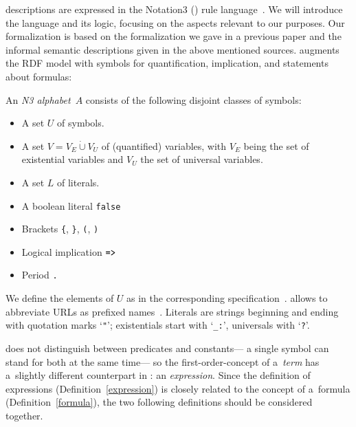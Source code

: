 
\restdesc descriptions are expressed in the Notation3 (\nthree) rule language~\cite{N3Logic,Notation3}.
We will introduce the \nthree language and its logic,
focusing on the aspects relevant to our purposes. Our formalization is based on the formalization we gave in a previous paper \cite{semN3} and the informal
semantic descriptions given in the above mentioned sources.
\nthree augments the RDF model with symbols for quantification, implication, and statements about formulas:


\begin{definition}
An \emph{N3 alphabet~$A$} consists of the following disjoint classes of symbols:
\begin{itemize}
\item A set $U$ of \uri symbols.
\item A set $V=V_E\mathbin{\dot{\cup}} V_U$  of (quantified) variables, with $V_E$ being the set of existential variables
and $V_U$ the set of universal variables.
\item A set $L$  of literals.
\item A boolean literal \verb!false!
\item Brackets \verb!{!, \verb!}!, \verb!(!, \verb!)!
\item Logical implication $\verb!=>!$ 
\item Period \verb!.!
\end{itemize}
\end{definition}



We define the elements of $U$ as in the corresponding specification~\cite{iri}.
\nthree allows to abbreviate URLs as prefixed names~\cite{turtle}.
Literals are strings beginning and ending with quotation marks `\verb!"!';
existentials start with `\verb!_:!', universals with `\verb!?!'.

\nthree does not distinguish between predicates and constants---%
a single \uri symbol can stand for both at the same time---%
so the first-order-concept of a~\emph{term}
has a~slightly different counterpart in \nthree: an \emph{expression}.
Since the definition of expressions (Definition~\ref{expression})
is closely related to the concept of a~formula (Definition~\ref{formula}),
the two following definitions should be considered together.

